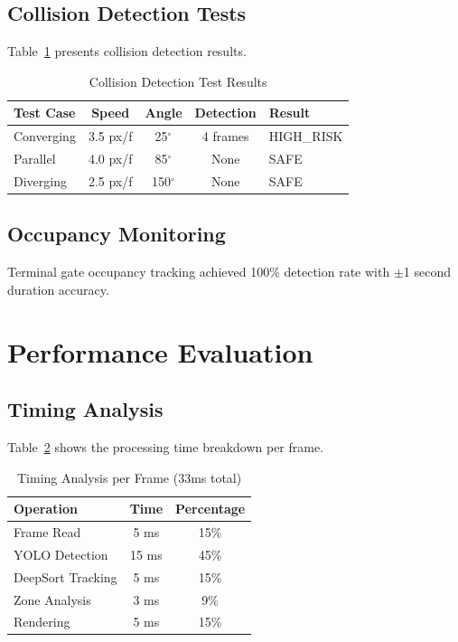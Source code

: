 \documentclass[conference]{IEEEtran}
\begin{document}
\subsection{Collision Detection Tests}
Table~\ref{tab:collision_tests} presents collision detection results.

\begin{table}[htbp]
\caption{Collision Detection Test Results}
\label{tab:collision_tests}
\begin{center}
\begin{tabular}{|l|c|c|c|p{1.2in}|}
\hline
\textbf{Test Case} & \textbf{Speed} & \textbf{Angle} & \textbf{Detection} & \textbf{Result} \\
\hline
Converging & 3.5 px/f & 25$^{\circ}$ & 4 frames & HIGH\_RISK \\
\hline
Parallel & 4.0 px/f & 85$^{\circ}$ & None & SAFE \\
\hline
Diverging & 2.5 px/f & 150$^{\circ}$ & None & SAFE \\
\hline
\end{tabular}
\end{center}
\end{table}

\subsection{Occupancy Monitoring}
Terminal gate occupancy tracking achieved 100\% detection rate with $\pm$1 second duration accuracy.

\section{Performance Evaluation}
\label{sec:performance}

\subsection{Timing Analysis}
Table~\ref{tab:timing} shows the processing time breakdown per frame.

\begin{table}[htbp]
\caption{Timing Analysis per Frame (33ms total)}
\label{tab:timing}
\begin{center}
\begin{tabular}{|l|c|c|}
\hline
\textbf{Operation} & \textbf{Time} & \textbf{Percentage} \\
\hline
Frame Read & 5 ms & 15\% \\
\hline
YOLO Detection & 15 ms & 45\% \\
\hline
DeepSort Tracking & 5 ms & 15\% \\
\hline
Zone Analysis & 3 ms & 9\% \\
\hline
Rendering & 5 ms & 15\% \\
\hline
\end{tabular}
\end{center}
\end{table}
\end{document}
